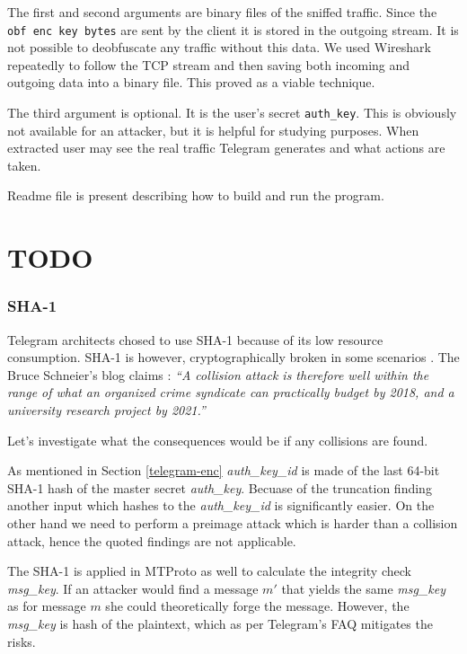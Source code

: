 \documentclass[thesis=M,english]{FITthesis}[2012/10/20]
\begin{document}
The first and second arguments are binary files of the sniffed traffic. Since the \texttt{obf\ enc\ key\ bytes} are sent by the client it is stored in the outgoing stream. It is not possible to deobfuscate any traffic without this data. We used Wireshark repeatedly to follow the TCP stream and then saving both incoming and outgoing data into a binary file. This proved as a viable technique.

The third argument is optional. It is the user's secret \texttt{auth\_key}. This is obviously not available for an attacker, but it is helpful for studying purposes. When extracted user may see the real traffic Telegram generates and what actions are taken.

Readme file is present describing how to build and run the program.




\chapter{TODO}

\subsection{SHA-1}

Telegram architects chosed to use SHA-1 because of its low resource consumption. SHA-1 is however, cryptographically broken in some scenarios \cite{telegram-sha1}. The Bruce Schneier's blog claims \cite{telegram-sha1}: \emph{``A collision attack is therefore well within the range of what an organized crime syndicate can practically budget by 2018, and a university research project by 2021.''}

Let's investigate what the consequences would be if any collisions are found.

As mentioned in Section \ref{telegram-enc} \emph{auth\_key\_id} is made of the last 64-bit SHA-1 hash of the master secret \emph{auth\_key}. Becuase of the truncation finding another input which hashes to the \emph{auth\_key\_id} is significantly easier. On the other hand we need to perform a preimage attack which is harder than a collision attack, hence the quoted findings are not applicable.

The SHA-1 is applied in MTProto as well to calculate the integrity check \emph{msg\_key}. If an attacker would find a message $m'$ that yields the same \emph{msg\_key} as for message $m$ she could theoretically forge the message. However, the \emph{msg\_key} is hash of the plaintext, which as per Telegram's FAQ \cite{telegram-techfaq} mitigates the risks.
\end{document}
